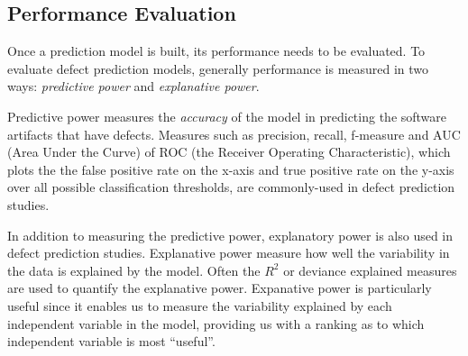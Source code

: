 \subsection{Performance Evaluation}

Once a prediction model is built, its performance needs to be evaluated. To evaluate defect prediction models, generally performance is measured in two ways: \emph{predictive power} and \emph{explanative power}.

Predictive power measures the \emph{accuracy} of the model in predicting the software artifacts that have defects. Measures such as precision, recall, f-measure and AUC (Area Under the Curve) of ROC (the Receiver Operating Characteristic), which plots the the false positive rate on the x-axis and true positive rate on the y-axis over all possible classification thresholds, are commonly-used in defect prediction studies.

In addition to measuring the predictive power, explanatory power is also used in defect prediction studies. Explanative power measure how well the variability in the data is explained by the model. Often the $R^2$ or deviance explained measures are used to quantify the explanative power. Expanative power is particularly useful since it enables us to measure the variability explained  by each independent variable in the model, providing us with a ranking as to which independent variable is most ``useful''.


\begin{comment}
\item Data collection
\item Metrics calculation
\item Model building
\item Model evaluation
\end{comment}